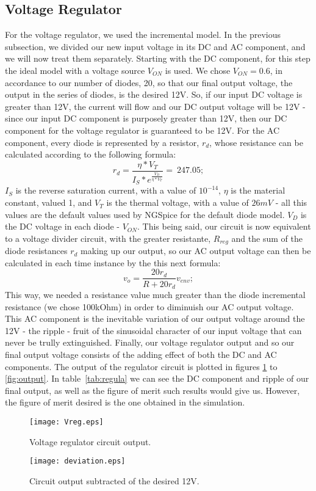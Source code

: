 \subsection{Voltage Regulator}
For the voltage regulator, we used the incremental model. In the previous subsection, we divided our new input voltage in its DC and AC component, and we will now treat them separately. Starting with the DC component, for this step the ideal model with a voltage source $V_{ON}$ is used. We chose $V_{ON} = 0.6$, in accordance to our number of diodes, 20, so that our final output voltage, the output in the series of diodes, is the desired 12V. So, if our input DC voltage is greater than 12V, the current will flow and our DC output voltage will be 12V - since our input DC component is purposely greater than 12V, then our DC component for the voltage regulator is guaranteed to be 12V.
For the AC component, every diode is represented by a resistor, $r_d$, whose resistance can be calculated according to the following formula:
\begin{equation}
r_d=\frac{\eta*V_T}{I_S*e^\frac{V_D}{\eta*V_T}}=~247.05;
\end{equation}
$I_{S}$ is the reverse saturation current, with a value of $10^{-14}$, $\eta$ is the material constant, valued 1, and $V_{T}$ is the thermal voltage, with a value of $26 mV$ - all this values are the default values used by NGSpice for the default diode model. $V_D$ is the DC voltage in each diode - $V_{ON}$. This being said, our circuit is now equivalent to a voltage divider circuit, with the greater resistante, $R_{reg}$ and the sum of the diode resistances $r_d$ making up our output, so our AC output voltage can then be calculated in each time instance by the this next formula:
\begin{equation}
v_o = \frac{20r_d}{R + 20r_d}v_{env};
\end{equation}
This way, we needed a resistance value much greater than the diode incremental resistance (we chose 100kOhm) in order to diminuish our AC output voltage. This AC component is the inevitable variation of our output voltage around the 12V - the ripple - fruit of the sinusoidal character of our input voltage that can never be trully extinguished. Finally, our voltage regulator output and so our final output voltage consists of the adding effect of both the DC and AC components. 
The output of the regulator circuit is plotted in figures \ref{fig:reg} to \ref{fig:output}. In table~\ref{tab:regula} we can see the DC component and ripple of our final output, as well as the figure of merit such results would give us. However, the figure of merit desired is the one obtained in the simulation.
\begin{figure}[h!] \centering
\texttt{[image: Vreg.eps]}
\caption{Voltage regulator circuit output.}
\label{fig:reg}
\end{figure}
\begin{figure}[h!] \centering
\texttt{[image: deviation.eps]}
\caption{Circuit output subtracted of the desired 12V.}
\label{fig:dc}
\end{figure}

